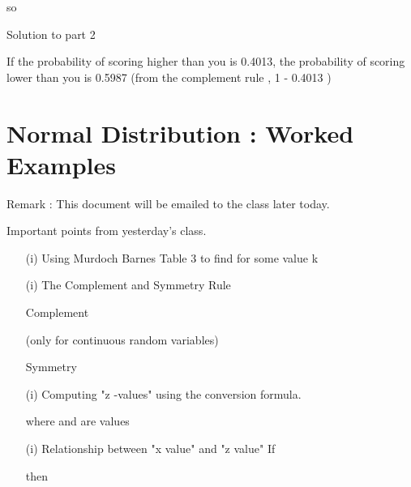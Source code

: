 \documentclass[]{report}
\begin{document}
	so  
	
	
	Solution to part 2
	
	If  the probability of scoring higher than you is 0.4013, the probability of scoring lower than you is 0.5987  
	(from the complement rule , 1 - 0.4013 )
	
	
	\newpage
	\section{Normal Distribution : Worked Examples}
	
	Remark : This document will be emailed to the class later today.
	
	
	Important points from yesterday's class.
	
	\begin{itemize}
		
		\item[(i)] Using Murdoch Barnes Table 3 to find   for some value k
		
		\item[(i)] The Complement and Symmetry Rule
		
		Complement   
		
		(only for continuous random variables)
		
		Symmetry   
		
		\item[(i)] Computing "z -values" using the conversion formula.
		
		
		
		where   and   are values
		\item[(i)] Relationship between "x value" and "z  value"
		If    
		
		then  
		
	\end{itemize}
	
	
\end{document}
